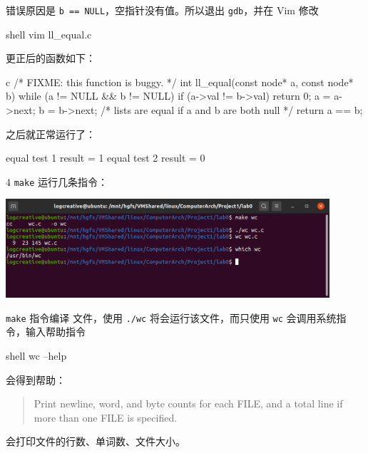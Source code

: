 \documentclass[12pt,a4paper]{article}
\newenvironment{problems}{\begin{list}{}{\renewcommand{\makelabel}[1]{\textbf{##1}.\hfil}}}{\end{list}}
\begin{document}
\begin{problems}
    错误原因是 \texttt{b == NULL}，空指针没有值。所以退出 \texttt{gdb}，并在 Vim 修改
    \begin{code}{shell}
        vim ll_equal.c
    \end{code}

    更正后的函数如下：

    \begin{code}{c}
/* FIXME: this function is buggy. */
int ll_equal(const node* a, const node* b) {
	while (a != NULL && b != NULL) {
		if (a->val != b->val)
			return 0;
		a = a->next;
		b = b->next;
	}
	/* lists are equal if a and b are both null */
	return a == b;
}
    \end{code}

    之后就正常运行了：
    \begin{literal}
equal test 1 result = 1
equal test 2 result = 0
    \end{literal}

    \item[4] \texttt{make}
    运行几条指令：
    
    \includegraphics[width=0.9\textwidth]{make.png}

    \texttt{make} 指令编译  文件，使用 \texttt{./wc} 将会运行该文件，而只使用 \texttt{wc} 会调用系统指令，输入帮助指令
    \begin{code}{shell}
        wc --help
    \end{code}
    会得到帮助：
    \begin{quote}
        Print newline, word, and byte counts for each FILE, and a total line if more than one FILE is specified.
    \end{quote}
    会打印文件的行数、单词数、文件大小。

    

\end{problems}
\end{document}
